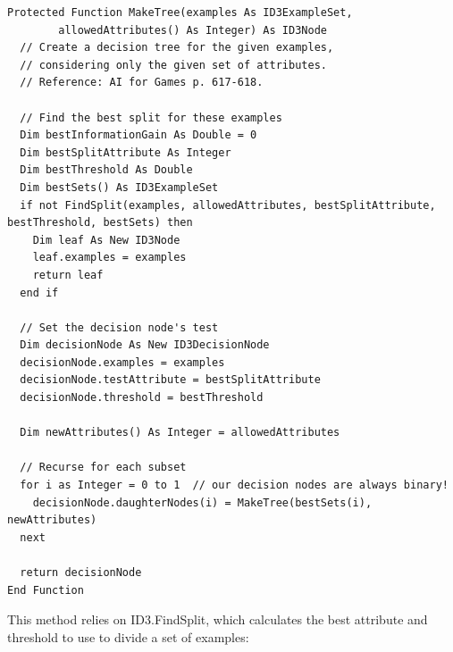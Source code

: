 \documentclass{article}
\begin{document}
\begin{lstlisting}
Protected Function MakeTree(examples As ID3ExampleSet, 
        allowedAttributes() As Integer) As ID3Node
  // Create a decision tree for the given examples, 
  // considering only the given set of attributes.
  // Reference: AI for Games p. 617-618.
  
  // Find the best split for these examples
  Dim bestInformationGain As Double = 0
  Dim bestSplitAttribute As Integer
  Dim bestThreshold As Double
  Dim bestSets() As ID3ExampleSet
  if not FindSplit(examples, allowedAttributes, bestSplitAttribute, bestThreshold, bestSets) then
    Dim leaf As New ID3Node
    leaf.examples = examples
    return leaf
  end if
  
  // Set the decision node's test
  Dim decisionNode As New ID3DecisionNode
  decisionNode.examples = examples
  decisionNode.testAttribute = bestSplitAttribute
  decisionNode.threshold = bestThreshold
  
  Dim newAttributes() As Integer = allowedAttributes
  
  // Recurse for each subset
  for i as Integer = 0 to 1  // our decision nodes are always binary!
    decisionNode.daughterNodes(i) = MakeTree(bestSets(i), newAttributes)
  next
  
  return decisionNode
End Function
\end{lstlisting}

This method relies on ID3.FindSplit, which calculates the best attribute and threshold to use to divide a set of examples:
\end{document}
